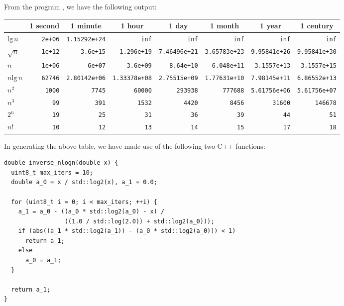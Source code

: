 From the program , we have the following
output:\par
\tiny\begin{tabular}{ l | r | r | r | r | r | r | r |}
    \qquad & \multicolumn{1}{c}{1 second} & \multicolumn{1}{c}{1 minute} 
          & \multicolumn{1}{c}{1 hour} & \multicolumn{1}{c}{1 day} & \multicolumn{1}{c}{1 month} 
          & \multicolumn{1}{c}{1 year} & \multicolumn{1}{c}{1 century} \\
    \hline
    $\text{lg}\,n$  & \texttt{2e+06}  & \texttt{1.15292e+24} & \texttt{inf}
    & \texttt{inf}         & \texttt{inf}         & \texttt{inf}         & \texttt{inf} \\
    \hline
    $\sqrt{n}$      & \texttt{1e+12}  & \texttt{3.6e+15}     & \texttt{1.296e+19}
    & \texttt{7.46496e+21} & \texttt{3.65783e+23} & \texttt{9.95841e+26} & \texttt{9.95841e+30} \\
    \hline
    $n$             & \texttt{1e+06}  & \texttt{6e+07}       & \texttt{3.6e+09}
    & \texttt{8.64e+10}    & \texttt{6.048e+11}   & \texttt{3.1557e+13}  & \texttt{3.1557e+15} \\
    \hline
    $n\text{lg}\,n$ & \texttt{62746}  & \texttt{2.80142e+06} & \texttt{1.33378e+08}
    & \texttt{2.75515e+09} & \texttt{1.77631e+10} & \texttt{7.98145e+11} & \texttt{6.86552e+13} \\
    \hline
    $n^2$           & \texttt{1000}   & \texttt{7745}        & \texttt{60000}
    & \texttt{293938}      & \texttt{777688}      & \texttt{5.61756e+06} & \texttt{5.61756e+07} \\
    \hline
    $n^3$           & \texttt{99}     & \texttt{391}         & \texttt{1532}
    & \texttt{4420}        & \texttt{8456}        & \texttt{31600}       & \texttt{146678} \\
    \hline
    $2^n$           & \texttt{19}     & \texttt{25}          & \texttt{31}
    & \texttt{36}          & \texttt{39}          & \texttt{44}          & \texttt{51} \\
    \hline
    $n!$            & \texttt{10}     & \texttt{12}          & \texttt{13}
    & \texttt{14}          & \texttt{15}          & \texttt{17}          & \texttt{18} \\
    \hline
\end{tabular}
\par \normalsize
\qquad In generating the above table, we have made use of the following two C++ functions:
\begin{verbatim}
double inverse_nlogn(double x) {
  uint8_t max_iters = 10;
  double a_0 = x / std::log2(x), a_1 = 0.0;

  for (uint8_t i = 0; i < max_iters; ++i) {
    a_1 = a_0 - ((a_0 * std::log2(a_0) - x) /
                 ((1.0 / std::log(2.0)) + std::log2(a_0)));
    if (abs((a_1 * std::log2(a_1)) - (a_0 * std::log2(a_0))) < 1)
      return a_1;
    else
      a_0 = a_1;
  }

  return a_1;
}
\end{verbatim}
